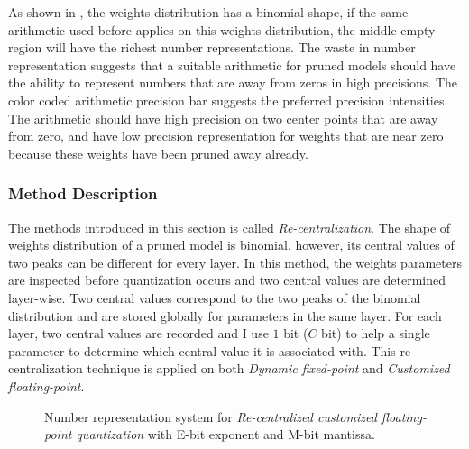 \documentclass[a4paper,12pt]{report}
\begin{document}
As shown in , the weights distribution has a binomial shape,
if the same arithmetic used before applies on this weights distribution,
the middle empty region will have the richest number representations.
The waste in number representation suggests that a suitable arithmetic for
pruned models should have the
ability to represent numbers that are away from zeros in high precisions.
The color coded arithmetic precision bar suggests the preferred precision
intensities.
The arithmetic should have high precision on two center points that are away
from zero, and have low precision representation for weights that are near zero
because these weights have been pruned away already.

\subsubsection{Method Description}
The methods introduced in this section is called \textit{Re-centralization}.
The shape of weights distribution of a pruned model is binomial, however, its
central values of two peaks can be different for every layer.
In this method, the weights parameters are inspected before quantization occurs and
two central values are determined layer-wise.
Two central values correspond to the two peaks of the binomial distribution
and are stored globally for parameters in the same layer.
For each layer, two central values are recorded and I use $1$ bit ($C$ bit) to
help a single parameter to determine which central value it is associated with.
This re-centralization technique is applied on both \textit{Dynamic fixed-point}
and \textit{Customized floating-point}.

\begin{figure}[!h]
\centering
{}
\caption{Number representation system for \textit{Re-centralized customized floating-point quantization} with
E-bit exponent and M-bit mantissa.}
\label{fig:number_rep_ccfp}
\end{figure}
\end{document}
